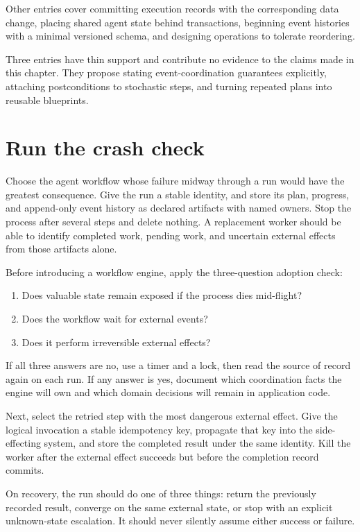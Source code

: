 Other entries cover committing execution records with the corresponding data change, placing shared agent state behind transactions, beginning event histories with a minimal versioned schema, and designing operations to tolerate reordering.

Three entries have thin support and contribute no evidence to the claims made in this chapter. They propose stating event-coordination guarantees explicitly, attaching postconditions to stochastic steps, and turning repeated plans into reusable blueprints.

\section{Run the crash check}\label{run-the-crash-check}

Choose the agent workflow whose failure midway through a run would have the greatest consequence. Give the run a stable identity, and store its plan, progress, and append-only event history as declared artifacts with named owners. Stop the process after several steps and delete nothing. A replacement worker should be able to identify completed work, pending work, and uncertain external effects from those artifacts alone.

Before introducing a workflow engine, apply the three-question adoption check:

\begin{enumerate}
\def\labelenumi{\arabic{enumi}.}
\tightlist
\item
  Does valuable state remain exposed if the process dies mid-flight?
\item
  Does the workflow wait for external events?
\item
  Does it perform irreversible external effects?
\end{enumerate}

If all three answers are no, use a timer and a lock, then read the source of record again on each run. If any answer is yes, document which coordination facts the engine will own and which domain decisions will remain in application code.

Next, select the retried step with the most dangerous external effect. Give the logical invocation a stable idempotency key, propagate that key into the side-effecting system, and store the completed result under the same identity. Kill the worker after the external effect succeeds but before the completion record commits.

On recovery, the run should do one of three things: return the previously recorded result, converge on the same external state, or stop with an explicit unknown-state escalation. It should never silently assume either success or failure.

